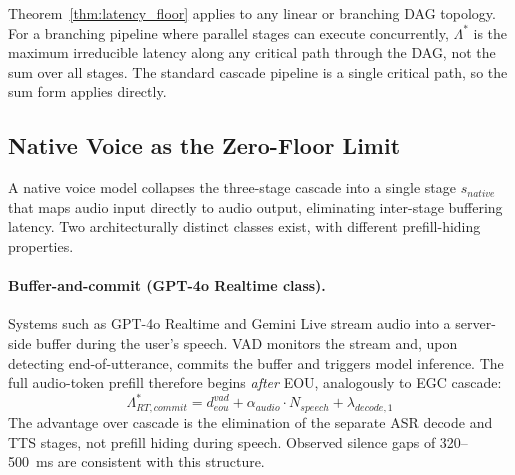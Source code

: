 \begin{remark}
Theorem~\ref{thm:latency_floor} applies to any linear or branching DAG topology.
For a branching pipeline where parallel stages can execute concurrently,
$\Lambda^*$ is the maximum irreducible latency along any critical path through the DAG,
not the sum over all stages.
The standard cascade pipeline is a single critical path,
so the sum form applies directly.
\end{remark}

\subsection{Native Voice as the Zero-Floor Limit}

A native voice model collapses the three-stage cascade into a single stage $s_{native}$
that maps audio input directly to audio output, eliminating inter-stage buffering latency.
Two architecturally distinct classes exist, with different prefill-hiding properties.

\paragraph{Buffer-and-commit (GPT-4o Realtime class).}
Systems such as GPT-4o Realtime \citep{openai2024realtimeapi} and Gemini Live
\citep{google2024geminivoice} stream audio into a server-side buffer during the user's speech.
VAD monitors the stream and, upon detecting end-of-utterance, commits the buffer and triggers
model inference.
The full audio-token prefill therefore begins \emph{after} EOU, analogously to EGC cascade:
\begin{equation}
  \Lambda^*_{RT,commit} = d_{eou}^{vad} + \alpha_{audio} \cdot N_{speech} + \lambda_{decode,1}
\end{equation}
The advantage over cascade is the elimination of the separate ASR decode and TTS stages,
not prefill hiding during speech.
Observed silence gaps of 320--500~ms are consistent with this structure.

